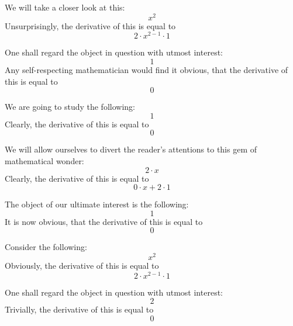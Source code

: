 \documentclass{article}
\begin{document}
We will take a closer look at this:
\begin{equation}
x ^{2 } 
\end{equation}
Unsurprisingly, the derivative of this is equal to
\begin{equation}
2 \cdot x ^{2 - 1 } \cdot 1 
\end{equation}

One shall regard the object in question with utmost interest:
\begin{equation}
1 
\end{equation}
Any self-respecting mathematician would find it obvious, that the derivative of this is equal to
\begin{equation}
0 
\end{equation}

We are going to study the following:
\begin{equation}
1 
\end{equation}
Clearly, the derivative of this is equal to
\begin{equation}
0 
\end{equation}

We will allow ourselves to divert the reader's attentions to this gem of mathematical wonder:
\begin{equation}
2 \cdot x 
\end{equation}
Clearly, the derivative of this is equal to
\begin{equation}
0 \cdot x + 2 \cdot 1 
\end{equation}

The object of our ultimate interest is the following:
\begin{equation}
1 
\end{equation}
It is now obvious, that the derivative of this is equal to
\begin{equation}
0 
\end{equation}

Consider the following:
\begin{equation}
x ^{2 } 
\end{equation}
Obviously, the derivative of this is equal to
\begin{equation}
2 \cdot x ^{2 - 1 } \cdot 1 
\end{equation}

One shall regard the object in question with utmost interest:
\begin{equation}
2 
\end{equation}
Trivially, the derivative of this is equal to
\begin{equation}
0 
\end{equation}
\end{document}
